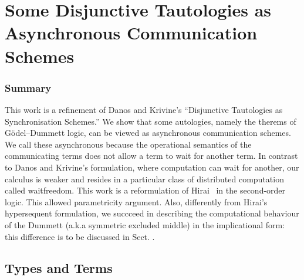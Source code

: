 \chapter{Some Disjunctive Tautologies as
  Asynchronous Communication Schemes}




% 


\subsection{Summary}
This work is a refinement of
Danos and Krivine's ``Disjunctive Tautologies as
Synchronisation Schemes.''
We show that some autologies,
namely the therems of G\"odel--Dummett logic,
can be viewed as asynchronous communication schemes.
We call these asynchronous because the operational semantics
of the communicating terms does not allow a term to wait for another
term.
In contrast to Danos and Krivine's  formulation,
where computation can wait for another,
our calculus is weaker and resides in a particular class of
distributed computation called waitfreedom.
This work is a reformulation of Hirai~ in the
second-order logic.
This allowed parametricity argument.
Also, differently from Hirai's  hypersequent formulation,
we succceed in describing the computational behaviour of the Dummett
(a.k.a symmetric excluded middle) in the implicational form: this
difference is to be discussed in Sect. .




\section{Types and Terms}

